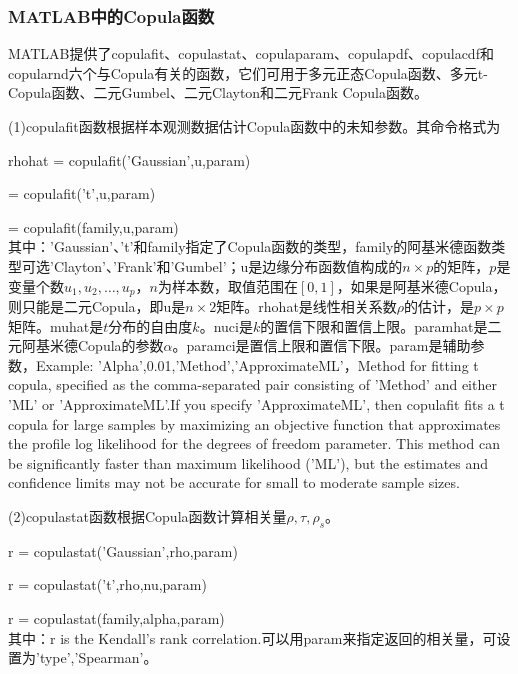         \subsubsection{MATLAB中的Copula函数}
            \par
            MATLAB提供了copulafit、copulastat、copulaparam、copulapdf、copulacdf和copularnd六个与Copula有关的函数，它们可用于多元正态Copula函数、多元t-Copula函数、二元Gumbel、二元Clayton和二元Frank Copula函数。
            \par
            (1)copulafit函数根据样本观测数据估计Copula函数中的未知参数。其命令格式为
            \par
            rhohat = copulafit('Gaussian',u,param)\par
            [rhohat,nuhat,nuci] = copulafit('t',u,param)\par
            [paramhat,paramci] = copulafit(family,u,param)\\
            其中：'Gaussian'、't'和family指定了Copula函数的类型，family的阿基米德函数类型可选'Clayton'、'Frank'和'Gumbel'；u是边缘分布函数值构成的$n\times p$的矩阵，$p$是变量个数$u_1,u_2,\dots,u_p$，$n$为样本数，取值范围在$[0,1]$，如果是阿基米德Copula，则只能是二元Copula，即u是$n\times 2$矩阵。rhohat是线性相关系数$\rho$的估计，是$p \times p$矩阵。muhat是$t$分布的自由度$k$。nuci是$k$的置信下限和置信上限。paramhat是二元阿基米德Copula的参数$\alpha$。paramci是置信上限和置信下限。param是辅助参数，Example: 'Alpha',0.01,'Method','ApproximateML'，Method for fitting t copula, specified as the comma-separated pair consisting of 'Method' and either 'ML' or 'ApproximateML'.If you specify 'ApproximateML', then copulafit fits a t copula for large samples by maximizing an objective function that approximates the profile log likelihood for the degrees of freedom parameter. This method can be significantly faster than maximum likelihood ('ML'), but the estimates and confidence limits may not be accurate for small to moderate sample sizes.
            \par
            (2)copulastat函数根据Copula函数计算相关量$\rho,\tau,\rho_s$。\par
            r = copulastat('Gaussian',rho,param)\par
            r = copulastat('t',rho,nu,param)\par
            r = copulastat(family,alpha,param)\\
            其中：r is the Kendall's rank correlation.可以用param来指定返回的相关量，可设置为'type','Spearman'。
            \par
